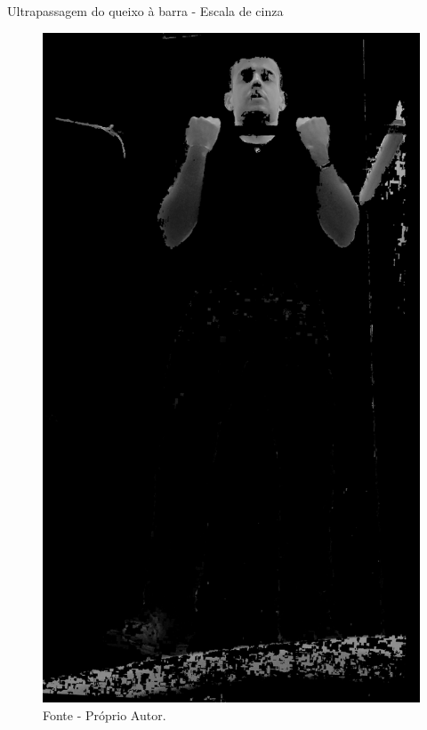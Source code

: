 \begin{frame}{Ultrapassagem do queixo à barra - Escala de cinza}
    \begin{figure}[!ht]
        \centering
            \includegraphics[scale=0.1]{img/desenvolvimento/ultrapassagemBarra/gray.png}
        \caption*{Fonte - Próprio Autor.}
    \end{figure}
\end{frame}

